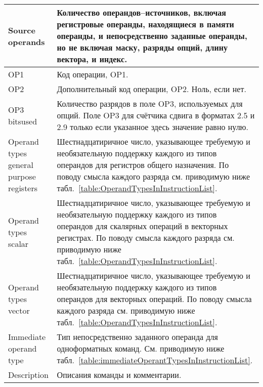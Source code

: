\documentclass[forwardcom.tex]{subfiles}
\begin{document}
\begin{longtable} {|p{18mm}|p{130mm}|}
Source operands & Количество операндов--источников, включая регистровые операнды, находящиеся в памяти операнды, и непосредственно заданные операнды, но не включая маску, разряды опций, длину вектора, и индекс. \\ \hline
OP1             & Код операции, OP1. \\ \hline
OP2             & Дополнительный код операции, OP2. Ноль, если нет. \\ \hline
OP3 bits\newline used   & Количество разрядов в поле OP3, используемых для опций. Поле OP3 для счётчика сдвига в форматах 2.5 и 2.9 только если указанное здесь значение равно нулю. \\ \hline
Operand types general purpose registers & Шестнадцатиричное число, указывающее требуемую и необязательную поддержку каждого из типов операндов для регистров общего назначения. По поводу смысла каждого разряда см. приводимую ниже табл.~\ref{table:OperandTypesInInstructionList}. \\ \hline
Operand types scalar & Шестнадцатиричное число, указывающее требуемую и необязательную поддержку каждого из типов операндов для скалярных операций в векторных регистрах. По поводу смысла каждого разряда см. приводимую ниже табл.~\ref{table:OperandTypesInInstructionList}. \\ \hline
Operand types vector & Шестнадцатиричное число, указывающее требуемую и необязательную поддержку каждого из типов операндов для векторных операций. По поводу смысла каждого разряда см. приводимую ниже табл.~\ref{table:OperandTypesInInstructionList}. \\ \hline
Immediate operand type & Тип непосредственно заданного операнда для одноформатных команд. См. приводимую ниже табл.~\ref{table:immediateOperantTypesInInstructionList}. \\ \hline
Description & Описания команды и комментарии. \\ \hline
\end{longtable}
\end{document}
